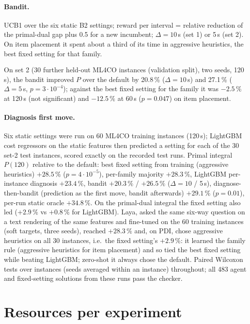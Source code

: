 \paragraph{Bandit.} UCB1 over the six static B2 settings; reward per interval = relative reduction of the primal-dual
gap plus 0.5 for a new incumbent; $\Delta=10$\,s (set 1) or 5\,s (set 2). On item placement it spent about a third of
its time in aggressive heuristics, the best fixed setting for that family.

On set 2 (30 further held-out ML4CO instances (validation split), two seeds, 120\,s), the bandit improved $P$ over the default by 20.8\,\%
($\Delta=10$\,s) and 27.1\,\% ($\Delta=5$\,s, $p=3\cdot10^{-4}$); against the best fixed setting for the
family it was $-2.5\,\%$ at 120\,s (not significant) and $-12.5\,\%$ at 60\,s ($p=0.047$) on item placement.

\paragraph{Diagnosis first move.} Six static settings were run on 60 ML4CO training instances (120\,s); LightGBM cost
regressors on the static features then predicted a setting for each of the 30 set-2 test instances, scored exactly on
the recorded test runs. Primal integral $P(120)$ relative to the default: best fixed setting from training (aggressive
heuristics) $+28.5\,\%$ ($p=4\cdot10^{-5}$), per-family majority $+28.3\,\%$, LightGBM per-instance diagnosis $+23.4\,\%$,
bandit $+20.3\,\%$ / $+26.5\,\%$ ($\Delta=10$ / 5\,s), diagnose-then-bandit (prediction as the first move, bandit
afterwards) $+29.1\,\%$ ($p=0.01$), per-run static oracle $+34.8\,\%$. On the primal-dual integral the fixed setting also led
($+2.9\,\%$ vs $+0.8\,\%$ for LightGBM). Laya, asked the same six-way question on a text rendering of the same
features and fine-tuned on the 60 training instances (soft targets, three seeds), reached $+28.3\,\%$ and, on PDI,
chose aggressive heuristics on all 30 instances, i.e.\ the fixed setting's $+2.9\,\%$: it learned the family rule (aggressive heuristics for item placement) and so tied the best fixed
setting while beating LightGBM; zero-shot it always chose the default.
Paired Wilcoxon tests over instances (seeds averaged within an instance) throughout; all 483 agent and fixed-setting solutions from these runs pass the checker.



\section{Resources per experiment}\label{app:resourcetable}


